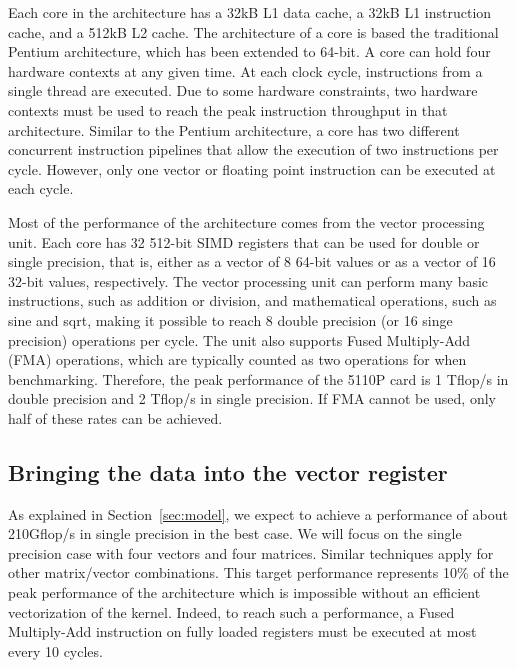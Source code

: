 \documentclass[10pt,conference,compsocconf]{IEEEtran}
\begin{document}
Each core in the architecture has a 32kB L1 data cache, a 32kB L1
instruction cache, and a 512kB L2 cache. The architecture of a core is
based the traditional Pentium architecture, which has been extended to
64-bit. A core can hold four hardware contexts at any given time. At each
clock cycle, instructions from a single thread are executed. Due to
some hardware constraints, two hardware contexts must be used to reach
the peak instruction throughput in that architecture. Similar to the
Pentium architecture, a core has two different concurrent instruction
pipelines that allow the execution of two instructions per
cycle. However, only one vector or floating point instruction can be
executed at each cycle.

Most of the performance of the architecture comes from the vector
processing unit. Each core has 32 512-bit SIMD registers that can be
used for double or single precision, that is, either as a vector of 8
64-bit values or as a vector of 16 32-bit values, respectively. The
vector processing unit can perform many basic instructions, such as
addition or division, and mathematical operations, such as sine and
sqrt, making it possible to reach 8 double precision (or 16 singe precision)
operations per cycle.  
The unit also supports Fused Multiply-Add (FMA)
operations, which are typically counted as two operations for
when benchmarking. Therefore, the peak performance of the 5110P
card is 1 Tflop/s in double precision and 2 Tflop/s in single
precision. If FMA cannot be used, only half of these rates can be
achieved.


\subsection{Bringing the data into the vector register}

As explained in Section~\ref{sec:model}, we expect to achieve a performance of
about 210Gflop/s in single precision in the best case. We will focus
on the single precision case with four vectors and four matrices. 
Similar techniques apply for other matrix/vector combinations. This target
performance represents 10\% of the peak performance of the
architecture which is impossible without an efficient vectorization of
the kernel. Indeed, to reach such a performance, a Fused Multiply-Add
instruction on fully loaded registers must be executed at most every
10 cycles.
\end{document}
